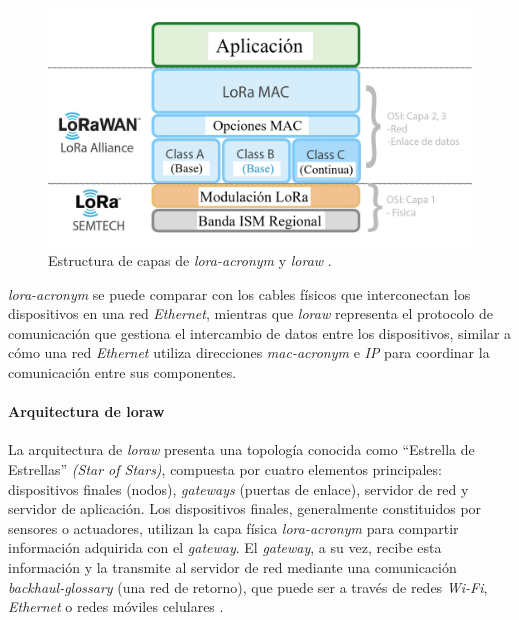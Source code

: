 \begin{figure}[H]
\leavevmode
\begin{minipage}{\textwidth}
\begin{center}
\includegraphics[scale=0.15]{./capitulo_02/figures/LoraLoraWAN.png}
\caption{Estructura de capas de \textit{\acrshort{lora-acronym}} y \textit{\acrshort{loraw}} \cite{doc_aboutlorawan}. \label{fig:loracapas}}
\end{center}
\end{minipage}
\end{figure}

\textit{\acrshort{lora-acronym}} se puede comparar con los cables físicos que interconectan los dispositivos en una red \textit{Ethernet}, mientras que \textit{\acrshort{loraw}} representa el protocolo de comunicación que gestiona el intercambio de datos entre los dispositivos, similar a cómo una red \textit{Ethernet} utiliza direcciones \textit{\acrshort{mac-acronym}} e \textit{IP} para coordinar la comunicación entre sus componentes.

\paragraph{Arquitectura de \acrshort{loraw}\\}
La arquitectura de \textit{\acrshort{loraw}} presenta una topología conocida como ``Estrella de Estrellas'' \textit{(Star of Stars)}, compuesta por cuatro elementos principales: dispositivos finales (nodos), \textit{gateways} (puertas de enlace), servidor de red y servidor de aplicación. Los dispositivos finales, generalmente constituidos por sensores o actuadores, utilizan la capa física \textit{\acrshort{lora-acronym}} para compartir información adquirida con el \textit{gateway}. El \textit{gateway}, a su vez, recibe esta información y la transmite al servidor de red mediante una comunicación \textit{\gls{backhaul-glossary}} (una red de retorno), que puede ser a través de redes \textit{Wi-Fi}, \textit{Ethernet} o redes móviles celulares \cite{sierra2023geolocalizacion}.\\

